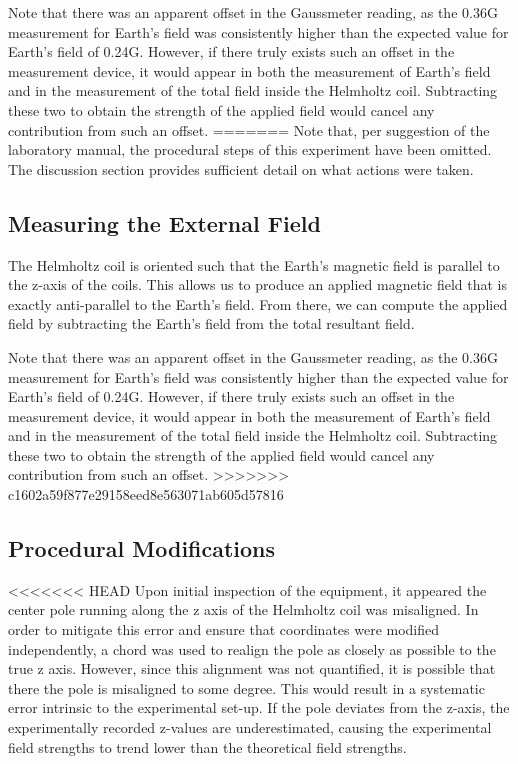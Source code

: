 \documentclass[a4paper]{article}
\begin{document}
Note that there was an apparent offset in the Gaussmeter reading, as
the 0.36G measurement for Earth's field was consistently higher than
the expected value for Earth's field of 0.24G. However, if there truly
exists such an offset in the measurement device, it would appear in
both the measurement of Earth's field and in the measurement of the
total field inside the Helmholtz coil. Subtracting these two to obtain
the strength of the applied field would cancel any contribution from
such an offset.
=======
\qq Note that, per suggestion of the laboratory manual, the procedural steps of this
experiment have been omitted. The discussion section provides sufficient detail
on what actions were taken.

\subsection{Measuring the External Field}
\qq The Helmholtz coil is oriented such that the Earth's magnetic field is parallel
to the z-axis of the coils. This allows us to produce an applied magnetic field
that is exactly anti-parallel to the Earth's field. From there, we can compute
the applied field by subtracting the Earth's field from the total resultant
field.

\qq Note that there was an apparent offset in the Gaussmeter reading, as the 0.36G
measurement for Earth's field was consistently higher than the expected value
for Earth's field of 0.24G. However, if there truly exists such an offset in the
measurement device, it would appear in both the measurement of Earth's field and
in the measurement of the total field inside the Helmholtz coil. Subtracting
these two to obtain the strength of the applied field would cancel any
contribution from such an offset.
>>>>>>> c1602a59f877e29158eed8e563071ab605d57816

\subsection{Procedural Modifications}

<<<<<<< HEAD
Upon initial inspection of the equipment, it appeared the center pole
running along the z axis of the Helmholtz coil was misaligned. In
order to mitigate this error and ensure that coordinates were modified
independently, a chord was used to realign the pole as closely as
possible to the true z axis. However, since this alignment was not
quantified, it is possible that there the pole is misaligned to some
degree. This would result in a systematic error intrinsic to the
experimental set-up. If the pole deviates from the z-axis, the
experimentally recorded z-values are underestimated, causing the
experimental field strengths to trend lower than the theoretical field
strengths.
\end{document}
